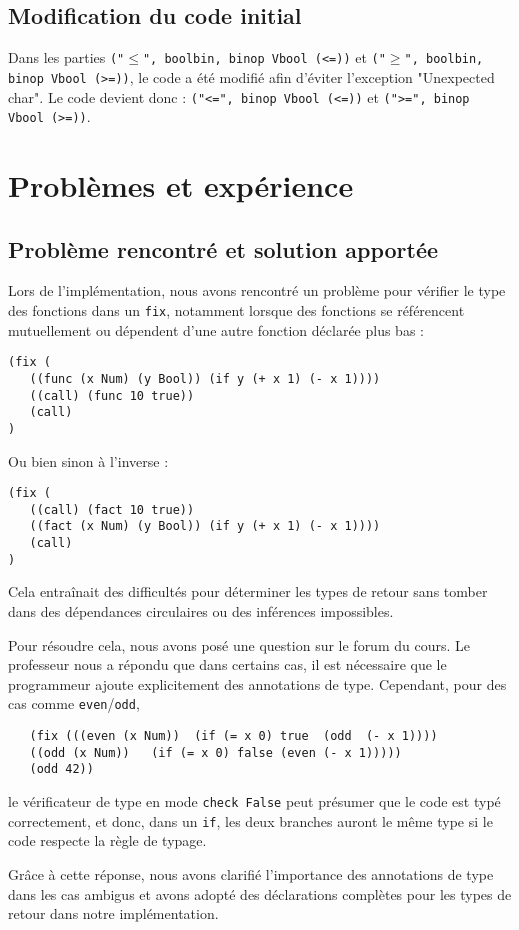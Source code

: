 \documentclass{article}
\begin{document}
\subsection{Modification du code initial}
Dans les parties \texttt{("$\leq$", boolbin, binop Vbool (<=))} et \texttt{("$\ge$", boolbin, binop Vbool (>=))}, le code a été modifié afin d'éviter l'exception "Unexpected char". Le code devient donc : \texttt{("<=", binop Vbool (<=))} et \texttt{(">=", binop Vbool (>=))}.
\hfill


\section{Problèmes et expérience}
\subsection{Problème rencontré et solution apportée}
Lors de l'implémentation, nous avons rencontré un problème pour vérifier le type des fonctions dans un \texttt{fix}, notamment lorsque des fonctions se référencent mutuellement ou dépendent d'une autre fonction déclarée plus bas :
\begin{verbatim}
(fix (
   ((func (x Num) (y Bool)) (if y (+ x 1) (- x 1))))
   ((call) (func 10 true))
   (call)
)
\end{verbatim}
Ou bien sinon à l'inverse :
\begin{verbatim}
(fix (
   ((call) (fact 10 true))
   ((fact (x Num) (y Bool)) (if y (+ x 1) (- x 1))))
   (call)
)
\end{verbatim}
Cela entraînait des difficultés pour déterminer les types de retour sans tomber dans des dépendances circulaires ou des inférences impossibles.

Pour résoudre cela, nous avons posé une question sur le forum du cours. Le professeur nous a répondu que dans certains cas, il est nécessaire que le programmeur ajoute explicitement des annotations de type. 
Cependant, pour des cas comme \texttt{even}/\texttt{odd}, 
\begin{verbatim}
   (fix (((even (x Num))  (if (= x 0) true  (odd  (- x 1)))) 
   ((odd (x Num))   (if (= x 0) false (even (- x 1))))) 
   (odd 42))
\end{verbatim}
le vérificateur de type en mode \texttt{check False} peut présumer que le code est typé correctement, et donc, dans un \texttt{if}, les deux branches auront le même type si le code respecte la règle de typage.

Grâce à cette réponse, nous avons clarifié l'importance des annotations de type dans les cas ambigus et avons adopté des déclarations complètes pour les types de retour dans notre implémentation.
\end{document}
